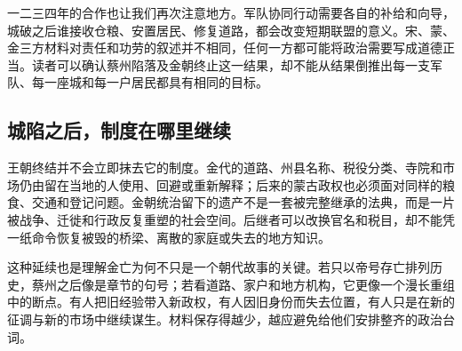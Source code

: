 一二三四年的合作也让我们再次注意地方。军队协同行动需要各自的补给和向导，城破之后谁接收仓粮、安置居民、修复道路，都会改变短期联盟的意义。宋、蒙、金三方材料对责任和功劳的叙述并不相同，任何一方都可能将政治需要写成道德正当。读者可以确认蔡州陷落及金朝终止这一结果，却不能从结果倒推出每一支军队、每一座城和每一户居民都具有相同的目标。

\subsection{城陷之后，制度在哪里继续}

王朝终结并不会立即抹去它的制度。金代的道路、州县名称、税役分类、寺院和市场仍由留在当地的人使用、回避或重新解释；后来的蒙古政权也必须面对同样的粮食、交通和登记问题。金朝统治留下的遗产不是一套被完整继承的法典，而是一片被战争、迁徙和行政反复重塑的社会空间。后继者可以改换官名和税目，却不能凭一纸命令恢复被毁的桥梁、离散的家庭或失去的地方知识。

这种延续也是理解金亡为何不只是一个朝代故事的关键。若只以帝号存亡排列历史，蔡州之后像是章节的句号；若看道路、家户和地方机构，它更像一个漫长重组中的断点。有人把旧经验带入新政权，有人因旧身份而失去位置，有人只是在新的征调与新的市场中继续谋生。材料保存得越少，越应避免给他们安排整齐的政治台词。
